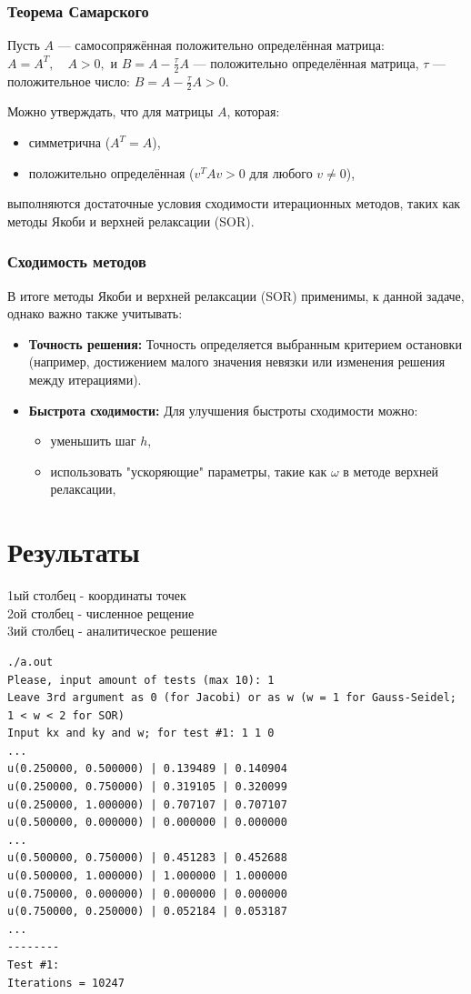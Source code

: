 \documentclass[a4paper, fleqn]{report}
\begin{document}
\subsection*{Теорема Самарского}
Пусть $A$ — самосопряжённая положительно определённая матрица:  
$A = A^T, \quad A > 0,$  
и $B = A - \frac{\tau}{2} A$ — положительно определённая матрица, $\tau$ — положительное число:  
$B = A - \frac{\tau}{2} A > 0.$

Можно утверждать, что для матрицы $A$, которая:
\begin{itemize}
    \item симметрична ($A^T = A$),
    \item положительно определённая ($v^T A v > 0$ для любого $v \neq 0$),
\end{itemize}
выполняются достаточные условия сходимости итерационных методов, таких как методы Якоби и верхней релаксации (SOR). 

\subsection*{Сходимость методов}
В итоге методы Якоби и верхней релаксации (SOR) применимы, к данной задаче, однако важно также учитывать:
\begin{itemize}
    \item \textbf{Точность решения:} Точность определяется выбранным критерием остановки (например, достижением малого значения невязки или изменения решения между итерациями).
    \item \textbf{Быстрота сходимости:} Для улучшения быстроты сходимости можно:
    \begin{itemize}
        \item уменьшить шаг $h$,
        \item использовать "ускоряющие" параметры, такие как $\omega$ в методе верхней релаксации,
    \end{itemize}
\end{itemize}
\newpage

\chapter{Результаты}
1ый столбец - координаты точек \\
2ой столбец - численное рещение \\
3ий столбец - аналитическое решение \\

\lstset{language=bash}
\begin{lstlisting}[title={Вывод метода Якоби дл 1го теста (для некоторых точек, покоординатно кратных 0.25)}]
./a.out
Please, input amount of tests (max 10): 1
Leave 3rd argument as 0 (for Jacobi) or as w (w = 1 for Gauss-Seidel; 1 < w < 2 for SOR)
Input kx and ky and w; for test #1: 1 1 0
...
u(0.250000, 0.500000) | 0.139489 | 0.140904
u(0.250000, 0.750000) | 0.319105 | 0.320099
u(0.250000, 1.000000) | 0.707107 | 0.707107
u(0.500000, 0.000000) | 0.000000 | 0.000000
...
u(0.500000, 0.750000) | 0.451283 | 0.452688
u(0.500000, 1.000000) | 1.000000 | 1.000000
u(0.750000, 0.000000) | 0.000000 | 0.000000
u(0.750000, 0.250000) | 0.052184 | 0.053187
...
--------
Test #1:
Iterations = 10247
\end{lstlisting}
\end{document}
